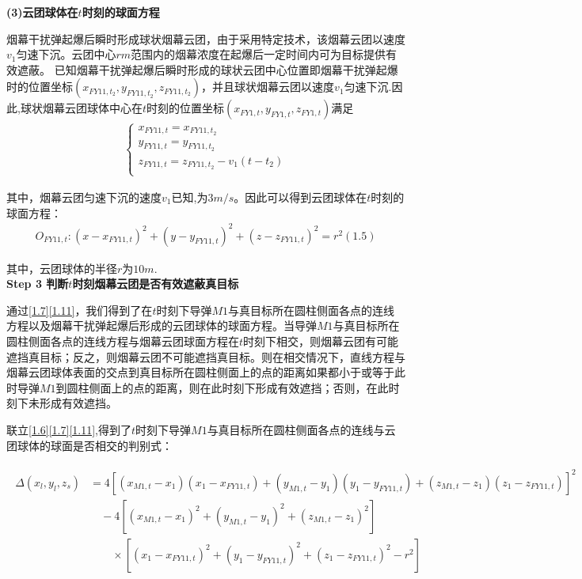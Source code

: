 \documentclass[../main.tex]{subfiles}
\begin{document}
\noindent \textbf{(3)云团球体在$t$时刻的球面方程 }
\par 烟幕干扰弹起爆后瞬时形成球状烟幕云团，由于采用特定技术，该烟幕云团以速度$v_1$匀速下沉。云团中心$rm$范围内的烟幕浓度在起爆后一定时间内可为目标提供有效遮蔽。
已知烟幕干扰弹起爆后瞬时形成的球状云团中心位置即烟幕干扰弹起爆时的位置坐标$\left( x_{FY11,t_2},y_{FY11,t_2},z_{FY11,t_2} \right)$，并且球状烟幕云团以速度$v_1$匀速下沉.因此,球状烟幕云团球体中心在$t$时刻的位置坐标$(x_{FY1,t}, y_{FY1,{t}}, z_{FY1,{t}})$满足
\begin{align}\label{1.10}
\left\{ \begin{array}{l}
	x_{FY11,t}=x_{FY11,t_2}\\
	y_{FY11,t}=y_{FY11,t_2}\\
	z_{FY11,t}=z_{FY11,t_2}-v_1\left( t-t_2 \right)\\
\end{array} \right. 
\end{align}
\par 其中，烟幕云团匀速下沉的速度$v_1$已知,为$3m/s$。因此可以得到云团球体在$t$时刻的球面方程：
\begin{align}\label{1.11}
O_{FY11,t}:\left( x-x_{FY11,t} \right) ^2+\left( y-y_{FY11,t} \right) ^2+\left( z-z_{FY11,t} \right) ^2=r^2\left( 1.5 \right) 
\end{align}
\par 其中，云团球体的半径$r$为$10m$.
\\
\textbf{Step 3 判断$t$时刻烟幕云团是否有效遮蔽真目标}
\par 通过\eqref{1.7}\eqref{1.11}，我们得到了在\( t \)时刻下导弹\( M1 \)与真目标所在圆柱侧面各点的连线方程以及烟幕干扰弹起爆后形成的云团球体的球面方程。当导弹\( M1 \)与真目标所在圆柱侧面各点的连线方程与烟幕云团球面方程在$t$时刻下相交，则烟幕云团有可能遮挡真目标；反之，则烟幕云团不可能遮挡真目标。则在相交情况下，直线方程与烟幕云团球体表面的交点到真目标所在圆柱侧面上的点的距离如果都小于或等于此时导弹$M1$到圆柱侧面上的点的距离，则在此时刻下形成有效遮挡；否则，在此时刻下未形成有效遮挡。
\par 联立\eqref{1.6}\eqref{1.7}\eqref{1.11},得到了$t$时刻下导弹\( M1 \)与真目标所在圆柱侧面各点的连线与云团球体的球面是否相交的判别式：
\begin{small}
\begin{align}\label{1.12}
	\begin{split}
\Delta(x_l, y_l, z_s) &= 4\left[(x_{M1,t} - x_1)(x_1 - x_{FY11,t}) + (y_{M1,t} - y_1)(y_1 - y_{FY11,t}) + (z_{M1,t} - z_1)(z_1 - z_{FY11,t})\right]^2 \\
&\quad - 4\left[(x_{M1,t} - x_1)^2 + (y_{M1,t} - y_1)^2 + (z_{M1,t} - z_1)^2\right] \\
&\quad\quad\times\left[(x_1 - x_{FY11,t})^2 + (y_1 - y_{FY11,t})^2 + (z_1 - z_{FY11,t})^2 - r^2\right]
\end{split}	
\end{align}	
\end{small}
\end{document}
